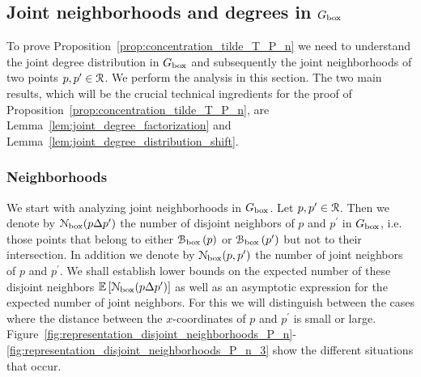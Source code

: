 \subsection{Joint neighborhoods and degrees in $G_{\text{box}}$}

To prove Proposition~\ref{prop:concentration_tilde_T_P_n} we need to understand the joint degree distribution in $G_{\text{box}}$ and subsequently the joint neighborhoods of two points $p, p^\prime \in {\mathcal R}$. We perform the analysis in this section. The two main results, which will be the crucial technical ingredients for the proof of Proposition~\ref{prop:concentration_tilde_T_P_n}, are Lemma~\ref{lem:joint_degree_factorization} and Lemma~\ref{lem:joint_degree_distribution_shift}.

\subsubsection*{Neighborhoods}

We start with analyzing joint neighborhoods in $G_{\text{box}}$. Let $p, p^\prime \in {\mathcal R}$. Then we denote by ${\mathcal N}_{\text{box}}(p\Delta p^\prime)$ the number of disjoint neighbors of $p$ and $p^\prime$ in $G_{\text{box}}$, i.e. those points that belong to either ${\mathcal B}_{\text{box}}\left(p\right)$ or ${\mathcal B}_{\text{box}}\left(p^\prime\right)$ but not to their intersection. In addition we denote by ${\mathcal N}_{\text{box}}(p,p^\prime)$ the number of joint neighbors of $p$ and $p^\prime$. We shall establish lower bounds on the expected number of these disjoint neighbors $\mathbb{E}\left[{\mathcal N}_{\text{box}}(p\Delta p^\prime)\right]$ as well as an asymptotic expression for the expected number of joint neighbors. For this we will distinguish between the cases where the distance between the $x$-coordinates of $p$ and $p^\prime$ is small or large. Figure~\ref{fig:representation_disjoint_neighborhoods_P_n}-\ref{fig:representation_disjoint_neighborhoods_P_n_3} show the different situations that occur.


